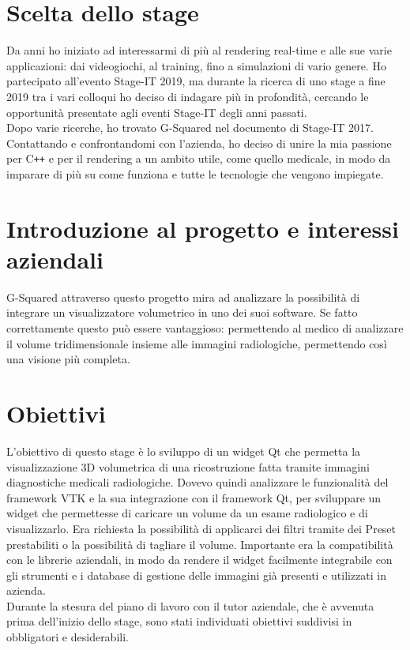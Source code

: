 \section{Scelta dello stage}
\label{scelta-dello-stage}
Da anni ho iniziato ad interessarmi di più al rendering real-time e alle sue varie applicazioni: dai videogiochi, al training, fino a simulazioni di vario genere.
Ho partecipato all'evento Stage-IT 2019, ma durante la ricerca di uno stage a fine 2019 tra i vari colloqui ho deciso di indagare più in profondità, cercando le opportunità presentate agli eventi Stage-IT degli anni passati. \\
Dopo varie ricerche, ho trovato G-Squared nel documento di Stage-IT 2017. Contattando e confrontandomi con l'azienda, ho deciso di unire la mia passione per C\texttt{++} e per il rendering a un ambito utile, come quello medicale, in modo da imparare di più su come funziona e tutte le tecnologie che vengono impiegate.

\section{Introduzione al progetto e interessi aziendali}
G-Squared attraverso questo progetto mira ad analizzare la possibilità di integrare un visualizzatore volumetrico in uno dei suoi software. Se fatto correttamente questo può essere vantaggioso: permettendo al medico di analizzare il volume tridimensionale insieme alle immagini radiologiche, permettendo così una visione più completa.

\section{Obiettivi}
L'obiettivo di questo stage è lo sviluppo di un widget Qt che permetta la visualizzazione 3D volumetrica di una ricostruzione fatta tramite immagini diagnostiche medicali radiologiche. Dovevo quindi analizzare le funzionalità del framework VTK e la sua integrazione con il framework Qt, per sviluppare un widget che permettesse di caricare un volume da un esame radiologico e di visualizzarlo. Era richiesta la possibilità di applicarci dei filtri tramite dei Preset prestabiliti o la possibilità di tagliare il volume.
Importante era la compatibilità con le librerie aziendali, in modo da rendere il widget facilmente integrabile con gli strumenti e i database di gestione delle immagini già presenti e utilizzati in azienda.\\
Durante la stesura del piano di lavoro con il tutor aziendale, che è avvenuta prima dell’inizio dello stage, sono stati individuati obiettivi suddivisi in obbligatori e desiderabili.


